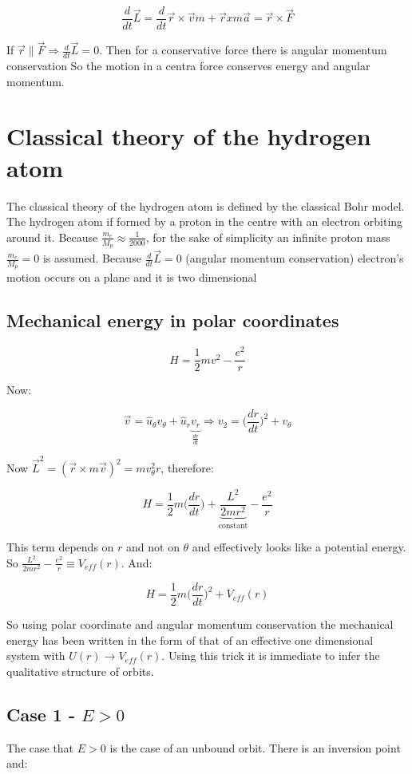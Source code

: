   $$\frac{d{}}{d{t}}\vec{L} = \frac{d{}}{d{t}}\vec{r}\times \vec{v}m + \vec{r}xm \vec{a} = \vec{r}\times \vec{F}$$

  If $\vec{r}\parallel \vec{F}\Rightarrow \frac{d{}}{d{t}}\vec{L} = 0$.
  Then for a conservative force there is angular momentum conservation
  So the motion in a centra force conserves energy and angular momentum.

\section{Classical theory of the hydrogen atom}
The classical theory of the hydrogen atom is defined by the classical Bohr model.
The hydrogen atom if formed by a proton in the centre with an electron orbiting around it.
Because $\frac{m_e}{M_p}\approx \frac{1}{2000}$, for the sake of simplicity an infinite proton mass $\frac{m_e}{M_p}=0$ is assumed.
Because $\frac{d{}}{d{t}}\vec{L}=0$ (angular momentum conservation) electron's motion occurs on a plane and it is two dimensional

  \subsection{Mechanical energy in polar coordinates}

  $$H = \frac{1}{2}m v^2-\frac{e^2}{r}$$

  Now:

  $$\vec{v} = \hat{u}_\theta v_\theta +\hat{u}_r\underbrace{v_r}_{\frac{d{r}}{d{t}}}\Rightarrow v_2 = \biggl(\frac{d{r}}{d{t}}\biggr)^2+v_\theta$$

  Now $\vec{L}^2 = (\vec{r}\times m \vec{v})^2 = mv_\theta^2r$, therefore:

  $$H = \frac{1}{2}m\biggl(\frac{d{r}}{d{t}}\biggr) + \underbrace{\frac{L^2}{2mr^2}}_{\text{constant}}-\frac{e^2}{r}$$
  
  This term depends on $r$ and not on $\theta$ and effectively looks like a potential energy.
  So $\frac{L^2}{2mr^2}-\frac{e^2}{r}\equiv V_{eff}(r)$.
  And:

  $$H = \frac{1}{2}m\biggl(\frac{d{r}}{d{t}}\biggr)^2+V_{eff}(r)$$

  So using polar coordinate and angular momentum conservation the mechanical energy has been written in the form of that of an effective one dimensional system with $U(r) \rightarrow V_{eff}(r)$.
  Using this trick it is immediate to infer the qualitative structure of orbits.

  \subsection{Case 1 - $E>0$}
  The case that $E>0$ is the case of an unbound orbit.
  There is an inversion point and:

